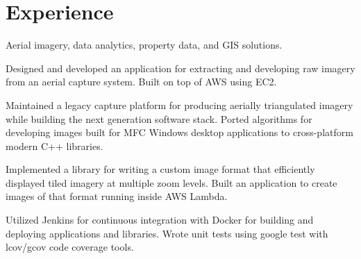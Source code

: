 \documentclass[letterpaper]{deedy-resume} %
\begin{document}
\begin{minipage}[t]{0.33\textwidth}


\sectionspace %



\end{minipage} %
\hfill
%
%
\begin{minipage}[t]{0.66\textwidth} %


\section{Experience}
Aerial imagery, data analytics, property data, and GIS solutions. 
\vspace{\topsep}
\begin{tightitemize}
\item Designed and developed an application for extracting and developing raw imagery from an aerial capture system. Built on top of AWS using EC2. 
\item Maintained a legacy capture platform for producing aerially triangulated imagery while building the next generation software stack. Ported algorithms for developing images built for MFC Windows desktop applications to cross-platform modern C++ libraries.
\item Implemented a library for writing a custom image format that efficiently displayed tiled imagery at multiple zoom levels. Built an application to create images of that format running inside AWS Lambda.
\item Utilized Jenkins for continuous integration with Docker for building and deploying applications and libraries. Wrote unit tests using google test with lcov/gcov code coverage tools.
\end{tightitemize}


\end{minipage}
\end{document}
